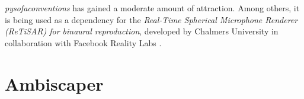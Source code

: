 \textit{pysofaconventions} has gained a moderate amount of attraction. Among others, it is being used as a dependency for the \textit{Real-Time Spherical Microphone Renderer (ReTiSAR) for binaural reproduction}, developed by Chalmers University in collaboration with Facebook Reality Labs \cite{helmholz2019real}.


\section{Ambiscaper}


%
%
%
%
%
%
%
%
